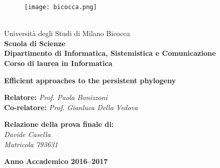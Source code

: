 
\begin{titlepage}

  \begin{spacing}{1.48}
    \begin{wrapfigure}[5]{l}[20mm]{0.2\linewidth}
      \texttt{[image: bicocca.png]}
    \end{wrapfigure}
    \text{} \\[-0.027\textheight]
    Università degli Studi di Milano Bicocca \\
    \textbf{Scuola di Scienze} \\
    \textbf{Dipartimento di Informatica, Sistemistica e Comunicazione} \\
    \textbf{Corso di laurea in Informatica}
  \end{spacing}

  \vfill

  \begin{spacing}{2}
    \begin{center}
      {\huge \textbf{Efficient approaches to the persistent phylogeny}}
    \end{center}
  \end{spacing}

  \vfill

  \begin{onehalfspace}
    \begin{flushleft}
      {\large
        \textbf{Relatore:} \textit{Prof. Paola Bonizzoni} \\
        \textbf{Co-relatore:} \textit{Prof. Gianluca Della Vedova}
      }
    \end{flushleft}
  \end{onehalfspace}

  \vfill

  \begin{onehalfspace}
    \begin{flushright}
      {\large
        \textbf{Relazione della prova finale di:} \\
        \textit{Davide Casella} \\
        \textit{Matricola 793631}
      }
    \end{flushright}
  \end{onehalfspace}

  \vfill

  \begin{center}
    {\large \textbf{Anno Accademico 2016--2017}}
  \end{center}

\end{titlepage}
